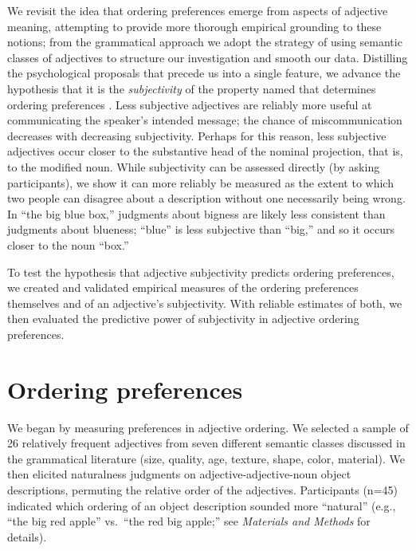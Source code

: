 \documentclass{pnastwo}
\begin{document}
\begin{article}
We revisit the idea that ordering preferences emerge from aspects of adjective meaning, attempting to provide more thorough empirical grounding to these notions;
from the grammatical approach we adopt the strategy of using semantic classes of adjectives to structure our investigation and smooth our data. 
Distilling the psychological proposals that precede us into a single feature, we advance the hypothesis that it is the \emph{subjectivity} of the property named that determines ordering preferences \cite{hetzron1978,quirketal1985,hill2012}.
Less subjective adjectives are reliably more useful at communicating the speaker's intended message; the chance of miscommunication decreases with decreasing subjectivity. 
Perhaps for this reason, less subjective adjectives occur closer to the substantive head of the nominal projection, that is, to the modified noun.  
While subjectivity can be assessed directly (by asking participants), we show it can more reliably be measured as the extent to which two people can disagree about a description without one necessarily being wrong. 
 In ``the big blue box,'' judgments about bigness are likely less consistent than judgments about blueness; ``blue'' is less subjective than ``big,'' and so it occurs closer to the noun ``box.''

To test the hypothesis that adjective subjectivity predicts ordering preferences, we created and validated empirical measures of the ordering preferences themselves and of an adjective's subjectivity. With reliable estimates of both, we then evaluated the predictive power of subjectivity in adjective ordering preferences.

\section{Ordering preferences}

We began by measuring preferences in adjective ordering. We selected a sample of 26 relatively frequent adjectives from seven different semantic classes discussed in the grammatical literature (size, quality, age, texture, shape, color, material). We then elicited naturalness judgments on adjective-adjective-noun object descriptions, permuting the relative order of the adjectives. Participants (n=45) indicated which ordering of an object description sounded more ``natural'' (e.g., ``the big red apple'' vs.\ ``the red big apple;'' see \emph{Materials and Methods} for details).


\end{article}
\end{document}
